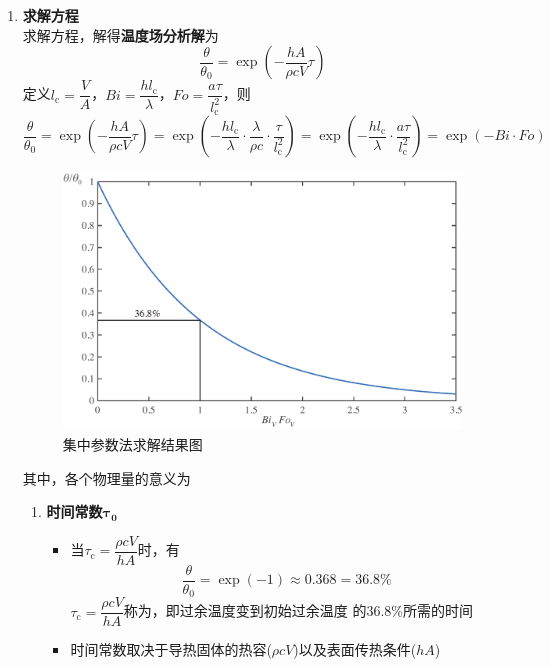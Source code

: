 \begin{enumerate}[\textbf{步骤} 1 ]
	\item \textbf{求解方程}\\
	求解方程，解得\textbf{温度场分析解}为
	\begin{equation}
		\dfrac{\theta}{\theta_0} = \exp\left(- \dfrac{hA}{\rho c V} \tau \right)
	\end{equation}
	定义$l_\text{c} = \dfrac{V}{A}$，$Bi = \dfrac{h l_\text{c}}{\lambda}$，$Fo = \dfrac{a \tau}{l_{\text{c}}^2}$，则
	\begin{equation}
		\dfrac{\theta}{\theta_0} = \exp\left(- \dfrac{hA}{\rho c V} \tau \right) = \exp\left(- \dfrac{hl_\text{c}}{\lambda} \cdot \dfrac{\lambda}{\rho c} \cdot \dfrac{\tau}{l_{\text{c}}^2} \right) = \exp\left(- \dfrac{hl_\text{c}}{\lambda} \cdot \dfrac{a \tau}{l_{\text{c}}^2} \right) = \exp (-Bi\cdot Fo)
	\end{equation}
	
	\begin{figure}[!htb]
		\centering
		\includegraphics[width=0.7\linewidth]{pic/集中参数法.pdf}
		\vspace*{-1em}
		\caption{集中参数法求解结果图}
		\label{集中参数法}
	\end{figure}
	
	其中，各个物理量的意义为
	\begin{enumerate}[\hspace*{2em}(1) ]
		\item \textbf{时间常数$\bm{\tau_0}$}
		\begin{itemize}
			\item 当$\tau_\text{c} = \dfrac{\rho cV}{hA}$时，有
			\begin{equation}
				\dfrac{\theta}{\theta_0} = \exp(-1) \approx 0.368 = 36.8\%
			\end{equation}
		$\tau_\text{c} = \dfrac{\rho cV}{hA}$称为，即过余温度变到初始过余温度
		的36.8\%所需的时间
		\item 时间常数取决于导热固体的热容($\rho cV$)以及表面传热条件($hA$)
		\end{itemize}
	

\end{enumerate}
\end{enumerate}

